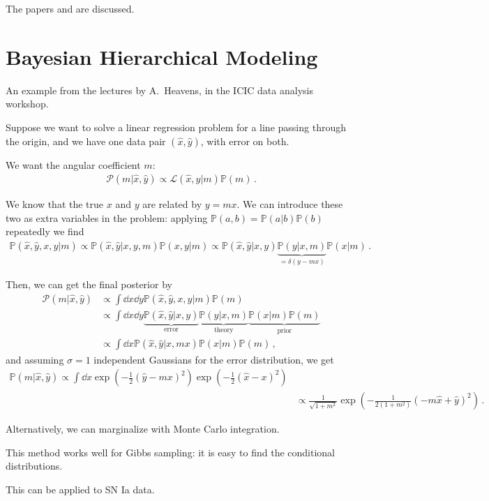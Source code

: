 \documentclass[main.tex]{subfiles}
\begin{document}

The papers \textcite[]{verdeFirstYearWilkinson2003} and \textcite[]{spergelFirstYearWilkinson2003} are discussed. 

\section{Bayesian Hierarchical Modeling}

An example from the lectures by A.\ Heavens, in the ICIC data analysis workshop. 

Suppose we want to solve a linear regression problem for a line passing through the origin, and we have one data pair \((\hat{x}, \hat{y})\), with error on both. 

We want the angular coefficient \(m\):
%
\begin{align}
\mathcal{P} (m | \hat{x}, \hat{y}) \propto \mathcal{L} (\hat{x}, \hat{y} | m) \mathbb{P}(m)
\,.
\end{align}

We know that the true \(x\) and \(y\) are related by \(y = mx\).
We can introduce these two as extra variables in the problem: applying \(\mathbb{P}(a, b) = \mathbb{P}(a | b) \mathbb{P}(b)\) repeatedly we find
%
\begin{align}
\mathbb{P}(\hat{x}, \hat{y}, x, y | m) \propto \mathbb{P}(\hat{x}, \hat{y} | x, y, m) \mathbb{P}(x, y | m) \propto \mathbb{P}(\hat{x}, \hat{y} | x, y) \underbrace{\mathbb{P}(y | x, m)}_{ = \delta (y - mx)} \mathbb{P}(x | m)
\,.
\end{align}

Then, we can get the final posterior by 
%
\begin{align}
\mathcal{P} (m | \hat{x}, \hat{y}) &\propto \int \dd{x} \dd{y} \mathbb{P}(\hat{x}, \hat{y}, x, y | m) \mathbb{P}(m)  \\
&\propto \int \dd{x} \dd{y} \underbrace{\mathbb{P}(\hat{x}, \hat{y} | x, y)}_{\text{error}} \underbrace{\mathbb{P}(y | x, m)}_{\text{theory}} \underbrace{\mathbb{P}(x | m) \mathbb{P}(m)}_{\text{prior}} \\
&\propto \int \dd{x} \mathbb{P}(\hat{x}, \hat{y} | x, mx)  \mathbb{P}(x | m) \mathbb{P}(m)
\,,
\end{align}
%
and assuming \(\sigma = 1\) independent Gaussians for the error distribution, we get 
%
\begin{align}
\mathbb{P}(m | \hat{x}, \hat{y}) \propto 
\int \dd{x} \exp(- \frac{1}{2} (\hat{y} - mx)^2) \exp( - \frac{1}{2} (\hat{x} - x)^2)  \\
&\propto \frac{1}{\sqrt{1 + m^2}} \exp( - \frac{1}{2 (1+m^2)} (- m \hat{x} + \hat{y})^2 )
\,.
\end{align}

Alternatively, we can marginalize with Monte Carlo integration.

This method works well for Gibbs sampling: it is easy to find the conditional distributions.

This can be applied to SN Ia data. 
\end{document}
